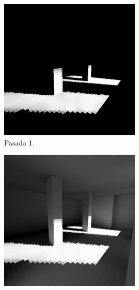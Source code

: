\begin{figure}[H]
	\centering
	\begin{subfigure}{0.24\textwidth}
		\centering
		\includegraphics[width=.95\linewidth]{media/radiosity1.png}
		\captionsetup{width=0.95\textwidth, justification=centering}
		\caption*{Pasada 1.}
	\end{subfigure}%
	\begin{subfigure}{0.24\textwidth}
		\centering
		\includegraphics[width=.95\linewidth]{media/radiosity2.png}

\end{subfigure}
\end{figure}
